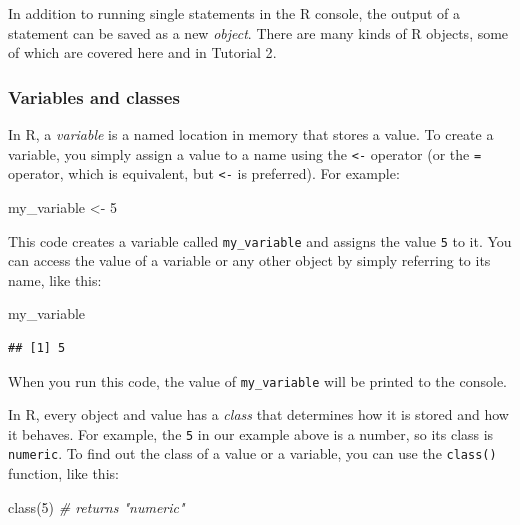 \documentclass[
]{book}
\newenvironment{Shaded}{\begin{snugshade}}{\end{snugshade}}
\newcommand{\CommentTok}[1]{\textcolor[rgb]{0.56,0.35,0.01}{\textit{#1}}}
\newcommand{\DecValTok}[1]{\textcolor[rgb]{0.00,0.00,0.81}{#1}}
\newcommand{\FunctionTok}[1]{\textcolor[rgb]{0.00,0.00,0.00}{#1}}
\newcommand{\NormalTok}[1]{#1}
\newcommand{\OtherTok}[1]{\textcolor[rgb]{0.56,0.35,0.01}{#1}}
\begin{document}
In addition to running single statements in the R console, the output of a statement can be saved as a new \emph{object}. There are many kinds of R objects, some of which are covered here and in \protect\hypertarget{programming_primers}{}{Tutorial 2}.

\hypertarget{variables-and-classes}{%
\subsubsection{Variables and classes}\label{variables-and-classes}}

In R, a \emph{variable} is a named location in memory that stores a value. To create a variable, you simply assign a value to a name using the \texttt{\textless{}-} operator (or the \texttt{=} operator, which is equivalent, but \texttt{\textless{}-} is preferred). For example:

\begin{Shaded}
\begin{Highlighting}[]
\NormalTok{my\_variable }\OtherTok{\textless{}{-}} \DecValTok{5}
\end{Highlighting}
\end{Shaded}

This code creates a variable called \texttt{my\_variable} and assigns the value \texttt{5} to it. You can access the value of a variable or any other object by simply referring to its name, like this:

\begin{Shaded}
\begin{Highlighting}[]
\NormalTok{my\_variable}
\end{Highlighting}
\end{Shaded}

\begin{verbatim}
## [1] 5
\end{verbatim}

When you run this code, the value of \texttt{my\_variable} will be printed to the console.

In R, every object and value has a \emph{class} that determines how it is stored and how it behaves. For example, the \texttt{5} in our example above is a number, so its class is \texttt{numeric}. To find out the class of a value or a variable, you can use the \texttt{class()} function, like this:

\begin{Shaded}
\begin{Highlighting}[]
\FunctionTok{class}\NormalTok{(}\DecValTok{5}\NormalTok{) }\CommentTok{\# returns "numeric"}
\end{Highlighting}
\end{Shaded}
\end{document}
